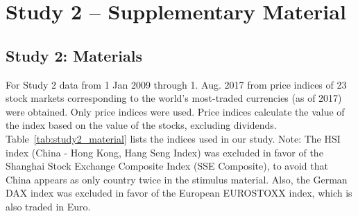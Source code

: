 




\section{Study 2 -- Supplementary Material}
\subsection{Study 2: Materials}
\label{study2_material}
For Study 2 data from 1 Jan 2009 through 1. Aug. 2017 from price indices of 23 stock markets corresponding to the world's most-traded currencies (as of 2017) were obtained. Only price indices were used. Price indices calculate the value of the index based on the value of the stocks, excluding dividends. Table~\ref{tab:study2_material} lists the indices used in our study. Note: The HSI index (China - Hong Kong, Hang Seng Index) was excluded in favor of the Shanghai Stock Exchange Composite Index (SSE Composite), to avoid that China appears as only country twice in the stimulus material. Also, the German DAX index was excluded in favor of the European EUROSTOXX index, which is also traded in Euro.
